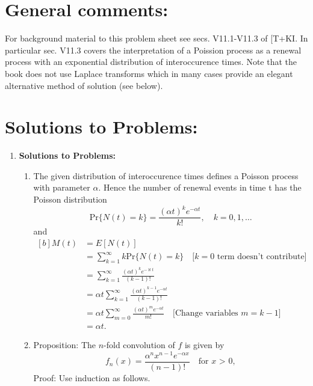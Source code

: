 \documentclass[11pt,a4paper]{article}
\begin{document}
  \section*{General comments:}
  For background material to this problem sheet see secs. V11.1-V11.3 of [T+KI. In particular sec. V11.3 covers the interpretation of a Poission process as a renewal process with an exponential distribution of interoccurence times. Note that the book does not use Laplace transforms which in many cases provide an elegant alternative method of solution (see below).
  \section*{Solutions to Problems:}
  \begin{enumerate}
    \item \textbf{Solutions to Problems:}
    \begin{enumerate}
      \item The given distribution of interoccurence times defines a Poisson process with parameter $\alpha$. Hence the number of renewal events in time t has the Poisson distribution
      $$
      \text{Pr}\{N(t) = k\} = \frac{(\alpha t)^ke^{-\alpha t}}{k!},\quad k = 0, 1,\ldots
      $$
      and
      \begin{equation}\tag{2.1}
        \begin{aligned}[b]
          M(t)
          &= E[N(t)]\\
          &= \sum_{k = 1}^\infty k\text{Pr}\{N(t) = k\}\quad \text{[$k = 0$ term doesn't contribute]}\\
          &= \sum_{k = 1}^\infty \frac{(\alpha t)^ke^{-\aleph t}}{(k - 1)!}\\
          &= \alpha t\sum_{k = 1}^\infty \frac{(\alpha t)^{k-1}e^{-\alpha t}}{(k - 1)!}\\
          &= \alpha t\sum_{m = 0}^{\infty}\frac{(\alpha t)^me^{-\alpha t}}{m!}\quad \text{[Change variables $m = k - 1$]}\\
          &= \alpha t.
        \end{aligned}
      \end{equation}
      \item Proposition: The $n$-fold convolution of $f$ is given by
      \begin{equation}\tag{2.2}
        f_n(x) = \frac{\alpha^nx^{n - 1}e^{-\alpha x}}{(n - 1)!}\quad \text{for $x$ > 0},
      \end{equation}
      Proof: Use induction as follows.
      \begin{itemize}

\end{itemize}
\end{enumerate}
\end{enumerate}
\end{document}
